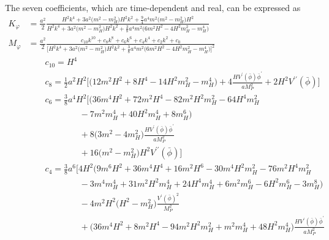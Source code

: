 \documentclass[11pt,a4paper]{article}
\newcommand{\ba}[1]{\begin{align} #1 \end{align}}
\newcommand{\MP}{M_P}
\begin{document}
The seven coefficients, which are time-dependent and real, can be expressed as 
\begin{subequations}\label{eq:scalar_sector_coeffs}
\ba{
    K_\varphi 
    & = \frac{a^2}{2} 
    \frac{
    H^2 k^4 
    + 3 a^2 \bigl( m^2 - m_H^2 \bigr) H^2 k^2 
    + \tfrac{9}{4} a^4 m^2 \bigl( m^2 - m_H^2 \bigr) H^2 
    }{
    H^2 k^4 
    + 3 a^2 \bigl( m^2 - m_H^2 \bigr) H^2 k^2 
    + \tfrac{3}{8} a^4 m^2 \bigl( 6 m^2 H^2 - 4 H^2 m_H^2 - m_H^4 \bigr)
    } 
    \\
    M_\varphi 
    & = \frac{a^2}{2} 
    \frac{
    c_{10} k^{10} 
    + c_8 k^8 
    + c_6 k^6 
    + c_4 k^4 
    + c_2 k^2 
    + c_0
    }{\bigl[ 
    H^2 k^4 
    + 3 a^2 \bigl( m^2 - m_H^2 \bigr) H^2 k^2 
    + \tfrac{3}{8} a^4 m^2 \bigl( 6 m^2 H^2 - 4 H^2 m_H^2 - m_H^4 \bigr) 
    \bigr]^2} \\ 
    & \qquad c_{10} = H^4 \nonumber \\ 
    & \qquad c_8 = \tfrac{1}{2} a^2 H^2 \bigl[ \bigl( 12 m^2 H^2 + 8 H^4 - 14 H^2 m_H^2 - m_H^4 \bigr) + 4 \tfrac{H V^\prime(\bar{\phi}) \bar{\phi}^\prime}{a \MP^2} + 2 H^2 V^{\prime\prime}(\bar{\phi}) \bigr] \nonumber \\ 
    & \qquad c_6 = \tfrac{3}{8} a^4 H^2 \bigl[ \bigl( 36 m^4 H^2 + 72 m^2 H^4 - 82 m^2 H^2 m_H^2 - 64 H^4 m_H^2 
    \nonumber \\ & \qquad \qquad \qquad  
    - 7 m^2 m_H^4 + 40 H^2 m_H^4 + 8 m_H^6 \bigr) 
    \nonumber \\ & \qquad \qquad \qquad  
    + 8 \bigl( 3 m^2 - 4 m_H^2 \bigr) \tfrac{H V^\prime(\bar{\phi}) \bar{\phi}^\prime}{a \MP^2} 
    \nonumber \\ & \qquad \qquad \qquad  
    + 16 \bigl( m^2 - m_H^2 \bigr) H^2 V^{\prime\prime}(\bar{\phi}) \bigr] \nonumber \\ 
    & \qquad c_4 = \tfrac{3}{8} a^6 \bigl[ 4 H^2 \bigl( 9 m^6 H^2 + 36 m^4 H^4 + 16 m^2 H^6 - 30 m^4 H^2 m_H^2 - 76 m^2 H^4 m_H^2 
    \nonumber \\ & \qquad \qquad \qquad  
    - 3 m^4 m_H^4 + 31 m^2 H^2 m_H^4 + 24 H^4 m_H^4 + 6 m^2 m_H^6 - 6 H^2 m_H^6 - 3 m_H^8 \bigr) 
    \nonumber \\ & \qquad \qquad \qquad  
    - 4 m^2 H^2 \bigl( H^2 - m_H^2 \bigr) \tfrac{V^\prime(\bar{\phi})^2}{\MP^2} 
    \nonumber \\ & \qquad \qquad \qquad  
    + \bigl( 36 m^4 H^2 + 8 m^2 H^4 - 94 m^2 H^2 m_H^2 + m^2 m_H^4 + 48 H^2 m_H^4 \bigr) \tfrac{H V^\prime(\bar{\phi}) \bar{\phi}^\prime}{a \MP^2} 
    \nonumber \\ & \qquad \qquad \qquad  
}
\end{subequations}
\end{document}
